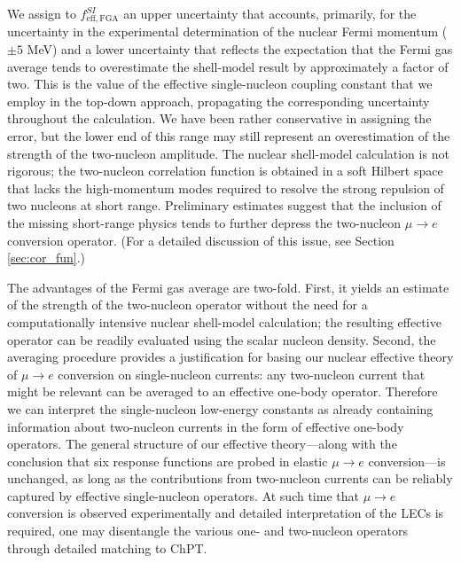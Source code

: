 \documentclass{book}[letterpaper,12pt]
\begin{document}
We assign to $f^{SI}_\mathrm{eff,FGA}$ an upper uncertainty that accounts, primarily, for the uncertainty in the experimental determination of the nuclear Fermi momentum ($\pm 5$ MeV) and a lower uncertainty that reflects the expectation that the Fermi gas average tends to overestimate the shell-model result by approximately a factor of two. This is the value of the effective single-nucleon coupling constant that we employ in the top-down approach, propagating the corresponding uncertainty throughout the calculation. We have been rather conservative in assigning the error, but the lower end of this range may still represent an overestimation of the strength of the two-nucleon amplitude. The nuclear shell-model calculation is not rigorous; the two-nucleon correlation function is obtained in a soft Hilbert space that lacks the high-momentum modes required to resolve the strong repulsion of two nucleons at short range. Preliminary estimates suggest that the inclusion of the missing short-range physics tends to further depress the two-nucleon $\mu\rightarrow e$ conversion operator. (For a detailed discussion of this issue, see Section \ref{sec:cor_fun}.)

The advantages of the Fermi gas average are two-fold. First, it yields an estimate of the strength of the two-nucleon operator without the need for a computationally intensive nuclear shell-model calculation; the resulting effective operator can be readily evaluated using the scalar nucleon density. Second, the averaging procedure provides a justification for basing our nuclear effective theory of $\mu\rightarrow e$ conversion on single-nucleon currents: any two-nucleon current that might be relevant can be averaged to an effective one-body operator. Therefore we can interpret the single-nucleon low-energy constants as already containing information about two-nucleon currents in the form of effective one-body operators. The general structure of our effective theory---along with the conclusion that six response functions are probed in elastic $\mu\rightarrow e$ conversion---is unchanged, as long as the contributions from two-nucleon currents can be reliably captured by effective single-nucleon operators. At such time that $\mu\rightarrow e$ conversion is observed experimentally and detailed interpretation of the LECs is required, one may disentangle the various one- and two-nucleon operators through detailed matching to ChPT.
\end{document}
